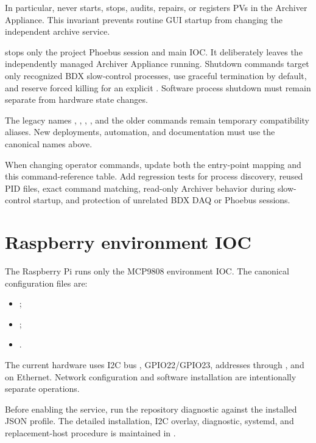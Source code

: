 In particular,  never starts, stops, audits, repairs, or registers PVs in the Archiver Appliance. This invariant prevents routine GUI startup from changing the independent archive service.

 stops only the project Phoebus session and main IOC. It deliberately leaves the independently managed Archiver Appliance running. Shutdown commands target only recognized BDX slow-control processes, use graceful termination by default, and reserve forced killing for an explicit . Software process shutdown must remain separate from hardware state changes.

The legacy names , , , , and the older  commands remain temporary compatibility aliases. New deployments, automation, and documentation must use the canonical names above.

When changing operator commands, update both the  entry-point mapping and this command-reference table. Add regression tests for process discovery, reused PID files, exact command matching, read-only Archiver behavior during slow-control startup, and protection of unrelated BDX DAQ or Phoebus sessions.

\section{Raspberry environment IOC}

The Raspberry Pi runs only the MCP9808 environment IOC. The canonical configuration files are:

\begin{itemize}
  \item {};
  \item {};
  \item {}.
\end{itemize}

The current hardware uses I2C bus , GPIO22/GPIO23, addresses  through , and  on Ethernet. Network configuration and software installation are intentionally separate operations.

Before enabling the service, run the repository diagnostic against the installed JSON profile. The detailed installation, I2C overlay, diagnostic, systemd, and replacement-host procedure is maintained in .
